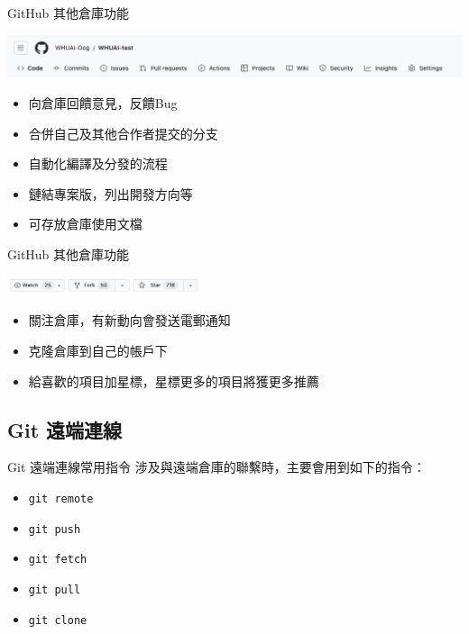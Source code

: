 \documentclass[xetex, unicode, 10pt, aspectratio=169]{beamer}
\begin{document}
\begin{frame}{GitHub 其他倉庫功能}
    \begin{center}
        \includegraphics[width=6in]{./img/github-repo-menu.png}
    \end{center}

    \begin{itemize}
        \item {}\quad 向倉庫回饋意見，反饋Bug
        \item {}\quad 合併自己及其他合作者提交的分支
        \item {}\quad 自動化編譯及分發的流程
        \item {}\quad 鏈結專案版，列出開發方向等
        \item {}\quad 可存放倉庫使用文檔
    \end{itemize}
\end{frame}

\begin{frame}{GitHub 其他倉庫功能}
    \begin{center}
        \includegraphics[width=2.25in]{./img/github-watch-fork-star.png}
    \end{center}

    \begin{itemize}
        \item {}\quad 關注倉庫，有新動向會發送電郵通知
        \item {}\quad 克隆倉庫到自己的帳戶下
        \item {}\quad 給喜歡的項目加星標，星標更多的項目將獲更多推薦
    \end{itemize}
\end{frame}

\subsection{Git 遠端連線}

\begin{frame}{Git 遠端連線常用指令}
    涉及與遠端倉庫的聯繫時，主要會用到如下的指令：
    \begin{itemize}
        \item \texttt{git remote}
        \item \texttt{git push}
        \item \texttt{git fetch}
        \item \texttt{git pull}
        \item \texttt{git clone}
    \end{itemize}
\end{frame}
\end{document}
